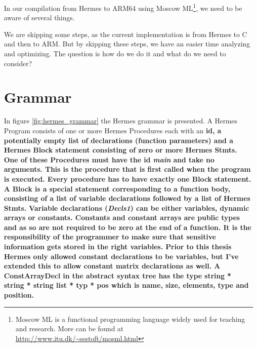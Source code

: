 In our compilation from Hermes to ARM64 using Moscow ML\footnote{Moscow ML is a functional programming language widely used for teaching and research. More can be found at \url{http://www.itu.dk/~sestoft/mosml.html}}, we need to be aware of several things.

We are skipping some steps, as the current implementation is from Hermes to C and then to ARM.
But by skipping these steps, we have an easier time analyzing and optimizing. The question is how do we do it and what do we need to consider?

\section{Grammar}
In figure \ref{fig:hermes_grammar} the Hermes grammar is presented.
A Hermes Program consists of one or more Hermes Procedures each with an \bf{id}, a potentially empty list of declarations (function parameters) and a Hermes Block statement consisting of zero or more Hermes Stmts.
One of these Procedures must have the \bf{id} \emph{main} and take no arguments. This is the procedure that is first called when the program is executed.
Every procedure has to have exactly one Block statement. A Block is a special statement corresponding to a function body, consisting of a list of variable declarations followed by a list of Hermes Stmts.
Variable declarations (\emph{Decls1}) can be either variables, dynamic arrays or constants. Constants and constant arrays are public types and as so are not required to be zero at the end of a function. It is the responsibility of the programmer to make sure that sensitive information gets stored in the right variables.
Prior to this thesis Hermes only allowed constant declarations to be variables, but I've extended this to allow constant matrix declarations as well.
A ConstArrayDecl in the abstract syntax tree has the type \bf{string * string * string list * typ * pos} which is name, size, elements, type and position.



\clearpage
\newpage

